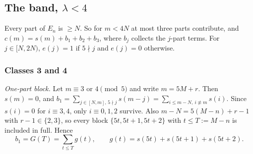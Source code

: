 \subsection{The band, \texorpdfstring{$\lambda<4$}{lambda < 4}}\label{sec:t-band}

Every part of $E_n$ is $\ge N$. So for $m<4N$ at most three parts contribute, and $c(m)=s(m)+b_1+b_2+b_3$, where $b_j$
collects the $j$-part terms. For $j\in[N,2N)$, $e(j)=1$ if $5\nmid j$ and $e(j)=0$ otherwise.

\subsubsection{Classes 3 and 4}\label{sec:t-band34}

\emph{One-part block.} Let $m\equiv3$ or $4\pmod 5$ and write $m=5M+r$. Then $s(m)=0$, and
$b_1=\sum_{j\in[N,m],\,5\nmid j}s(m-j)=\sum_{i\le m-N,\ i\not\equiv m}s(i)$. Since $s(i)=0$ for $i\equiv3,4$, only
$i\equiv0,1,2$ survive. Also $m-N=5(M-n)+r-1$ with $r-1\in\{2,3\}$, so every block $\{5t,5t+1,5t+2\}$ with $t\le T:=M-n$
is included in full. Hence
\[
b_1=G(T)=\sum_{t\le T}g(t),\qquad g(t)=s(5t)+s(5t+1)+s(5t+2).
\]

